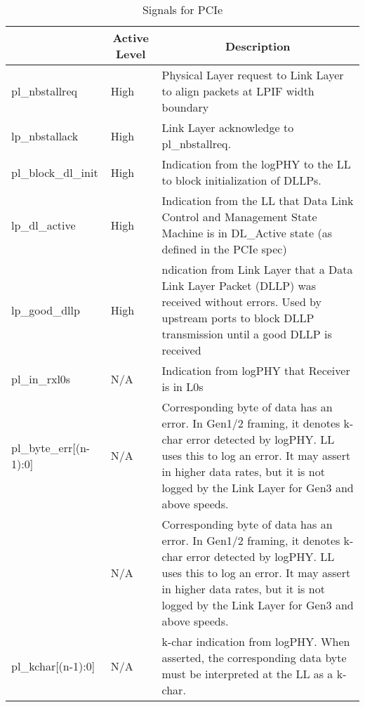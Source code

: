 \begin{table}[H]
    \caption{Signals for PCIe}
    \centering
  \begin{tabular}{ |m{26mm}|m{10mm}|m{60mm}|  }
\hline
\rowcolor{Gray}
\multicolumn{1}{|c|}{\textbf{Name} } 
& \multicolumn{1}{|c|}{\textbf{Active Level}} 
& \multicolumn{1}{|c|}{\textbf{Description}}\\
\hline
pl\_nbstallreq& High &Physical Layer request to Link Layer to align packets at LPIF width boundary \\ \hline 
lp\_nbstallack& High & Link Layer acknowledge to pl\_nbstallreq.\\ \hline 

pl\_block\_dl\_init &High & Indication from the logPHY to the LL to block initialization of DLLPs.\\ \hline 
lp\_dl\_active &High & Indication from the LL that Data Link Control and Management State Machine is in
DL\_Active state (as defined in the PCIe spec)\\ \hline 
lp\_good\_dllp &High & ndication from Link Layer that a Data Link Layer Packet (DLLP) was received without errors. Used by upstream ports to block DLLP transmission until a good DLLP is received\\ \hline 
pl\_in\_rxl0s & N/A& Indication from logPHY that Receiver is in L0s\\ \hline 
pl\_byte\_err[(n-1):0] &N/A & Corresponding byte of data has an error. In Gen1/2 framing, it denotes k-char error 
detected by logPHY. LL uses this to log an error. It may assert in higher data rates, but it
is not logged by the Link Layer for Gen3 and above speeds.\\ \hline 
&N/A & Corresponding byte of data has an error. In Gen1/2 framing, it denotes k-char error detected by logPHY. LL uses this to log an error. It may assert in higher data rates, but it
is not logged by the Link Layer for Gen3 and above speeds.
\\ \hline 
pl\_kchar[(n-1):0] &N/A & k-char indication from logPHY. When asserted, the corresponding data byte must be
interpreted at the LL as a k-char.\\ \hline 

\end{tabular}
\end{table}

